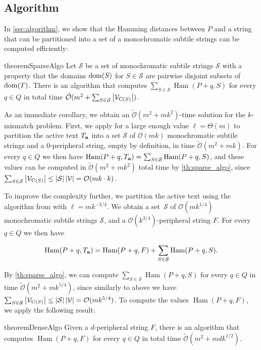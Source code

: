 \documentclass[11pt, letterpaper]{article}
\theoremstyle{plain}
\theoremstyle{definition}
\theoremstyle{remark}
\renewcommand{\O}{\mathcal{O}}
\newcommand{\tO}{\tilde{\mathcal{O}}}
\renewcommand{\S}{\mathcal{S}}
\newcommand{\V}{\mathcal{V}}
\DeclareMathOperator*{\Ham}{Ham}
\newcommand{\absolute}[1]{\left\lvert#1\right\rvert}
\begin{document}
\subsection{Algorithm}
In \cref{sec:algorithm}, we show that the Hamming distances between $P$ and a string that can be partitioned into a set of a monochromatic subtile strings can be computed efficiently: 

\begin{restatable}{theorem}{SparseAlgo}
\label{th:sparse_algo}
Let $\S$ be a set of monochromatic subtile strings $\S$ with a property that the domains $\operatorname*{dom}(S)$ for $S \in \S$ are pairwise disjoint subsets of $\operatorname*{dom}(T)$. There is an algorithm that computes
$\sum_{S \in \S} \Ham(P + q, S)$ for every $q \in Q$ in total time $\tO(m^2 + \sum_{S \in \S} \absolute{\V_{\getchar{S}}})$.
\end{restatable}

As an immediate corollary, we obtain an $\tO(m^2 + mk^2)$-time solution for the $k$-mismatch problem. First, we apply  for a large enough value $\ell = \Theta(m)$ to partition the active text $T_\mathbf{a}$ into a set $\S$ of $\O(mk)$ monochromatic subtile strings and a $0$-peripheral string, empty by definition, in time $\tO(m^2 + mk)$. For every $q \in Q$ we then have $\Ham(P + q, \Ta) = \sum_{S \in \S} \Ham(P + q, S)$, and these values can be computed in $\tO(m^2 + mk^{2})$ total time by \cref{th:sparse_algo}, since $\sum_{S \in \S} \absolute{\V_{\getchar{S}}} \le \absolute{\S} \absolute{\V} = \O(mk \cdot k)$. 

To improve the complexity further, we partition the active text using the algorithm from  with $\ell = mk^{-3/4}$.
We obtain a set~$\S$ of $\O(mk^{1/4})$ monochromatic subtile strings $\S$, and a $\O(k^{3 / 4})$-peripheral string $F$. For every $q \in Q$ we then have

\[ \Ham(P + q, \Ta) = \Ham(P + q, F) + \sum_{S \in \S} \Ham(P + q, S).\]

By \cref{th:sparse_algo}, we can compute $\sum_{S \in \S} \Ham(P + q, S)$ for every $q \in Q$ in time $\tO(m^2 + mk^{5/4})$, since similarly to above we have $\sum_{S \in \S} \absolute{\V_{\getchar{S}}} \le \absolute{\S} \absolute{\V} = \O(mk^{5/4})$. To compute the values $\Ham(P + q, F)$, we apply the following result:

\begin{restatable*}{theorem}{DenseAlgo}
\label{th:dense_algo}
Given a $d$-peripheral string $F$, there is an algorithm that computes $\Ham(P + q, F)$ for every $q \in Q$ in total time $\tO(m^2 + mdk^{1/2})$.
\end{restatable*}
\end{document}
